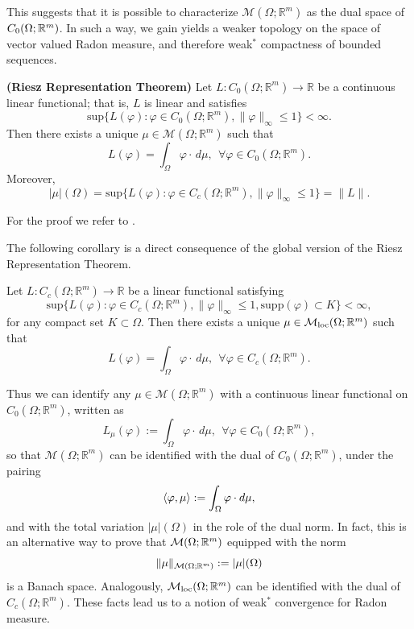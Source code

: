 This suggests that it is possible to characterize $\mathcal{M}(\Omega; \mathbb{R}^{m})$ as the dual space of $C_{0}(\Omega; \mathbb{R}^{m})$. In such a way, we gain yields a weaker topology on the space of vector valued Radon measure, and therefore weak$^{*}$ compactness of bounded sequences. 

\begin{theorem} \label{Rieszreprfin} {\bf (Riesz Representation Theorem)} 
Let $L: C_{0}(\Omega; \mathbb{R}^{m}) \to \mathbb{R}$ be a continuous linear functional; that is, $L$ is linear and satisfies
\[ \mathrm{sup} \{ L(\varphi) : \varphi \in C_{0}(\Omega; \mathbb{R}^{m}), \|\varphi\|_{\infty} \le 1 \} < \infty. \]
Then there exists a unique $\mu \in \mathcal{M}(\Omega; \mathbb{R}^{m})$ such that
\[ L(\varphi) = \int_{\Omega} \varphi \cdot \, d\mu, \  \ \forall \varphi \in C_{0}(\Omega; \mathbb{R}^{m}).  \]
Moreover, 
\[ |\mu|(\Omega) = \mathrm{sup}\{ L(\varphi) : \varphi \in C_{c}(\Omega; \mathbb{R}^{m}), \|\varphi\|_{\infty} \le 1\} = \|L\|. \]
\end{theorem}
For the proof we refer to \cite[Theorem 1.54]{AFP}.

The following corollary is a direct consequence of the global version of the Riesz Representation Theorem.

\begin{corollary} \label{Rieszrepr} Let $L: C_{c} (\Omega; \mathbb{R}^{m}) \to \mathbb{R}$ be a linear functional satisfying
\[ \mathrm{sup} \{ L(\varphi) : \varphi \in C_{c} (\Omega; \mathbb{R}^{m}), \|\varphi\|_{\infty} \le 1, \mathrm{supp}(\varphi) \subset K \} < \infty, \]
for any compact set $K \subset \Omega$.
Then there exists a unique $\mu \in \mathcal{M}_{\rm loc}(\Omega; \mathbb{R}^{m})$ such that
\[ L(\varphi) = \int_{\Omega} \varphi \cdot \, d\mu, \  \ \forall \varphi \in C_{c}(\Omega; \mathbb{R}^{m}).  \]
\end{corollary}

Thus we can identify any $\mu \in \mathcal{M}(\Omega; \mathbb{R}^{m})$ with a continuous linear functional on $C_{0}(\Omega; \mathbb{R}^{m})$, written as
\[ L_{\mu}(\varphi) := \int_{\Omega} \varphi \cdot \, d\mu, \      \     \forall \varphi \in C_{0}(\Omega; \mathbb{R}^{m}),   \]
so that $\mathcal{M}(\Omega; \mathbb{R}^{m})$ can be identified with the dual of $C_{0}(\Omega; \mathbb{R}^{m})$, under the pairing
\begin{equation*}
\left\langle \varphi, \mu \right\rangle := \int_{\Omega} \varphi \cdot d \mu,
\end{equation*}
and with the total variation $|\mu|(\Omega)$ in the role of the dual norm. In fact, this is an alternative way to prove that $\mathcal{M}(\Omega; \mathbb{R}^{m})$ equipped with the norm 
\begin{equation*}
\|\mu\|_{\mathcal{M}(\Omega; \mathbb{R}^{m})} := |\mu|(\Omega)
\end{equation*}
is a Banach space. Analogously, $\mathcal{M}_{\rm loc}(\Omega; \mathbb{R}^{m})$ can be identified with the dual of $C_{c}(\Omega; \mathbb{R}^{m})$. These facts lead us to a notion of weak$^{*}$ convergence for Radon measure.

